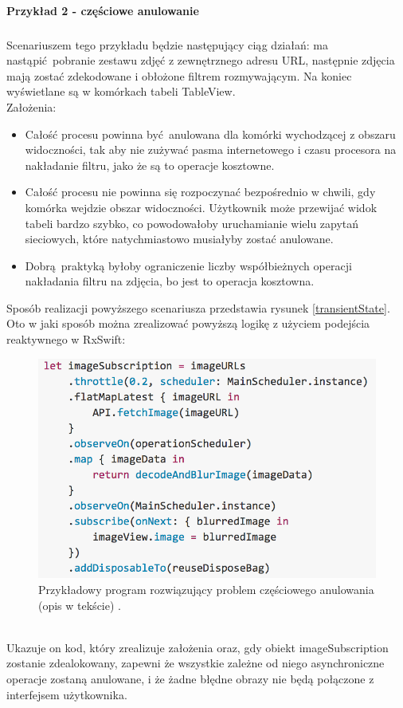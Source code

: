 \documentclass[12pt,oneside,a4paper]{report}
\begin{document}
\paragraph{Przykład 2 - częściowe anulowanie}
\subparagraph{}Scenariuszem tego przykładu będzie następujący ciąg działań: ma nastąpić pobranie zestawu zdjęć z zewnętrznego adresu URL, następnie zdjęcia mają zostać zdekodowane i obłożone filtrem rozmywającym. Na koniec wyświetlane są w komórkach tabeli TableView.\\
Założenia: 
\begin{itemize}
	\item Całość procesu powinna być anulowana dla komórki wychodzącej z obszaru widoczności, tak aby nie zużywać pasma internetowego i czasu procesora na nakładanie filtru, jako że są to operacje kosztowne.
	\item Całość procesu nie powinna się rozpoczynać bezpośrednio w chwili, gdy komórka wejdzie obszar widoczności. Użytkownik może przewijać widok tabeli bardzo szybko, co powodowałoby uruchamianie wielu zapytań sieciowych, które natychmiastowo musiałyby zostać anulowane.
	\item Dobrą praktyką byłoby ograniczenie liczby współbieżnych operacji nakładania filtru na zdjęcia, bo jest to operacja kosztowna.
\end{itemize}
Sposób realizacji powyższego scenariusza przedstawia rysunek \ref{transientState}.
Oto w jaki sposób można zrealizować powyższą logikę z użyciem podejścia reaktywnego w RxSwift: 
\begin{figure}[ht!]
	\centering
	\includegraphics[width=12cm]{compositionalDisposal}
	\caption{Przykładowy program rozwiązujący problem częściowego anulowania (opis w tekście) \cite{transientState}.}
	\label{compositionalDisposal}
\end{figure}\\
Ukazuje on kod, który zrealizuje założenia oraz, gdy obiekt imageSubscription zostanie zdealokowany, zapewni że wszystkie zależne od niego asynchroniczne operacje zostaną anulowane, i że żadne błędne obrazy nie będą połączone z interfejsem użytkownika.
\pagebreak
\end{document}
